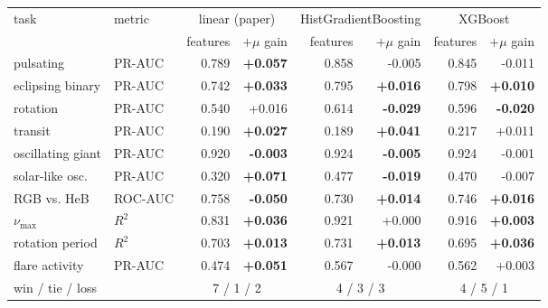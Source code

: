 \begin{tabular}{llrrrrrr}
\toprule
task & metric & \multicolumn{2}{c}{linear (paper)} & \multicolumn{2}{c}{HistGradientBoosting} & \multicolumn{2}{c}{XGBoost} \\
\cmidrule(lr){3-4}\cmidrule(lr){5-6}\cmidrule(lr){7-8}
 & & features & $+\mu$ gain & features & $+\mu$ gain & features & $+\mu$ gain \\
\midrule
pulsating & PR-AUC & 0.789 & \textbf{+0.057} & 0.858 & -0.005 & 0.845 & -0.011 \\
eclipsing binary & PR-AUC & 0.742 & \textbf{+0.033} & 0.795 & \textbf{+0.016} & 0.798 & \textbf{+0.010} \\
rotation & PR-AUC & 0.540 & +0.016 & 0.614 & \textbf{-0.029} & 0.596 & \textbf{-0.020} \\
transit & PR-AUC & 0.190 & \textbf{+0.027} & 0.189 & \textbf{+0.041} & 0.217 & +0.011 \\
oscillating giant & PR-AUC & 0.920 & \textbf{-0.003} & 0.924 & \textbf{-0.005} & 0.924 & -0.001 \\
solar-like osc. & PR-AUC & 0.320 & \textbf{+0.071} & 0.477 & \textbf{-0.019} & 0.470 & -0.007 \\
RGB vs. HeB & ROC-AUC & 0.758 & \textbf{-0.050} & 0.730 & \textbf{+0.014} & 0.746 & \textbf{+0.016} \\
$\nu_{\max}$ & $R^2$ & 0.831 & \textbf{+0.036} & 0.921 & +0.000 & 0.916 & \textbf{+0.003} \\
rotation period & $R^2$ & 0.703 & \textbf{+0.013} & 0.731 & \textbf{+0.013} & 0.695 & \textbf{+0.036} \\
flare activity & PR-AUC & 0.474 & \textbf{+0.051} & 0.567 & -0.000 & 0.562 & +0.003 \\
\midrule
win / tie / loss & & \multicolumn{2}{c}{7 / 1 / 2} & \multicolumn{2}{c}{4 / 3 / 3} & \multicolumn{2}{c}{4 / 5 / 1} \\
\bottomrule
\end{tabular}
